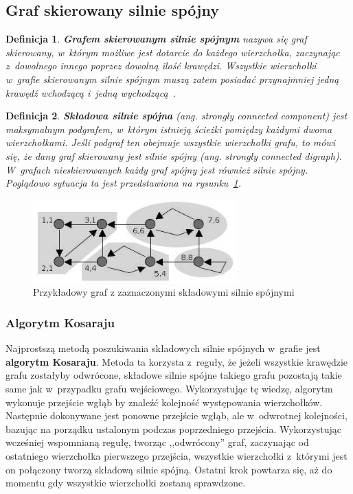 \documentclass[twoside,12pt]{report}
\newtheorem{definition}{Definicja} %
\begin{document}
\subsection{Graf skierowany silnie spójny}\label{sec:graf_spojny}

\begin{definition}
\textbf{Grafem skierowanym silnie spójnym} nazywa się graf skierowany, w~którym możliwe jest dotarcie do każdego wierzchołka, zaczynając z~dowolnego innego poprzez dowolną ilość krawędzi. Wszystkie wierzchołki w~grafie skierowanym silnie spójnym muszą zatem posiadać przynajmniej jedną krawędź wchodzącą i~jedną wychodzącą~\cite{silniespojny}.
\end{definition}

\begin{definition}
\textbf{Składowa silnie spójna} (ang. strongly connected component) jest maksymalnym podgrafem, w~którym istnieją ścieżki pomiędzy każdymi dwoma wierzchołkami. Jeśli podgraf ten obejmuje wszystkie wierzchołki grafu, to mówi się, że dany graf skierowany jest silnie spójny (ang. strongly connected digraph). W~grafach nieskierowanych każdy graf spójny jest również silnie spójny. Poglądowo sytuacja ta jest przedstawiona na rysunku~\ref{fig:ex_silnie_spojna}.
\end{definition}

\begin{figure}[htbp]
	\centering
	\includegraphics[width=0.7\textwidth]{img/tajran}
	\caption{Przykładowy graf z zaznaczonymi składowymi silnie spójnymi}
	\label{fig:ex_silnie_spojna}
\end{figure}

\subsubsection{Algorytm Kosaraju}
Najprostszą metodą poszukiwania składowych silnie spójnych w~grafie jest \textbf{algorytm Kosaraju}. Metoda ta korzysta z~reguły, że jeżeli wszystkie krawędzie grafu zostałyby odwrócone, składowe silnie spójne takiego grafu pozostają takie same jak w~przypadku grafu wejściowego. Wykorzystując tę wiedzę, algorytm wykonuje przejście wgłąb by znaleźć kolejność występowania wierzchołków. Następnie dokonywane jest ponowne przejście wgłąb, ale w~odwrotnej kolejności, bazując na porządku ustalonym podczas poprzedniego przejścia. Wykorzystując wcześniej wspomnianą regułę, tworząc ,,odwrócony'' graf, zaczynając od ostatniego wierzchołka pierwszego przejścia, wszystkie wierzchołki z~którymi jest on połączony tworzą składową silnie spójną. Ostatni krok powtarza się, aż do momentu gdy wszystkie wierzchołki zostaną sprawdzone.
\end{document}

